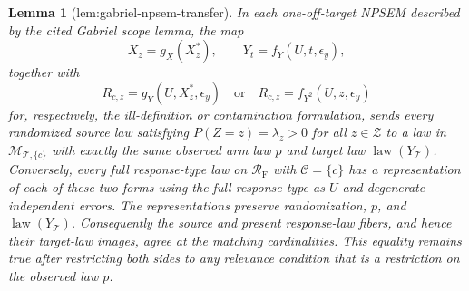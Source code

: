 \documentclass{article}
\newtheorem{lemma}{Lemma}
\begin{document}
\begin{lemma}[lem:gabriel-npsem-transfer]\label{lem:gabriel-npsem-transfer}
In each one-off-target NPSEM described by the cited Gabriel scope lemma, the map
\[
 X_z=g_X(X_z^*),\qquad
 Y_t=f_Y(U,t,\epsilon_y),
\]
together with
\[
 R_{c,z}=g_Y(U,X_z^*,\epsilon_y)
 \quad\text{or}\quad
 R_{c,z}=f_{Y^2}(U,z,\epsilon_y)
\]
for, respectively, the ill-definition or contamination formulation, sends every randomized source law satisfying \(P(Z=z)=\lambda_z>0\) for all \(z\in\mathcal Z\) to a law in \(\mathcal M_{\mathcal T,\{c\}}\) with exactly the same observed arm law \(p\) and target law \(\operatorname{law}(Y_{\mathcal T})\).  Conversely, every full response-type law on \(\mathcal R_{\mathrm F}\) with \(\mathcal C=\{c\}\) has a representation of each of these two forms using the full response type as \(U\) and degenerate independent errors.  The representations preserve randomization, \(p\), and \(\operatorname{law}(Y_{\mathcal T})\).  Consequently the source and present response-law fibers, and hence their target-law images, agree at the matching cardinalities.  This equality remains true after restricting both sides to any relevance condition that is a restriction on the observed law \(p\).
\end{lemma}
\end{document}
